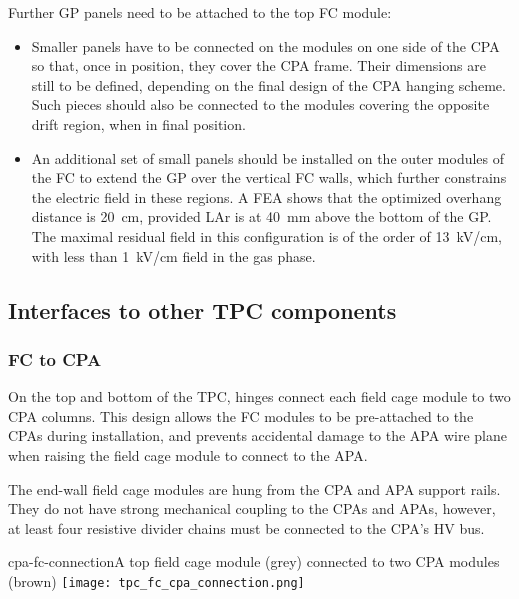 Further GP panels need to be attached to the top FC module:
\begin{itemize}
\item Smaller panels have to be connected on the modules on one side of the CPA so that, once in position, they 
cover the CPA frame. Their dimensions are 
still to be defined, depending on the final design of the CPA hanging scheme. Such  pieces should also be connected to the modules covering the opposite drift region, when in final position.
\item An additional 
set of small panels should be installed on the outer modules of the FC to extend the GP over the vertical FC walls, which 
further constrains the electric field in these regions. A FEA 
shows that the optimized overhang distance is 20~cm, provided LAr is at 40~mm above the bottom of the GP. The maximal residual field in this configuration is of the order of 13~kV/cm, with less than 1~kV/cm field in the gas phase.
\end{itemize}

\subsection{Interfaces to other TPC components}

\subsubsection{FC to CPA}

On the top and bottom of the TPC, hinges connect each field cage module to two CPA columns.  This design allows the FC modules to be pre-attached to the CPAs during installation, and prevents accidental damage to the APA wire plane when raising the field cage module to connect 
to the APA.

The end-wall field cage modules are hung from the CPA and APA support rails.  They do not have strong mechanical coupling to the CPAs and APAs, however, at least four resistive divider chains must be connected to the CPA's HV bus. 

\begin{cdrfigure}{cpa-fc-connection}{A top field cage module (grey) connected to two CPA modules (brown)}
\texttt{[image: tpc\_fc\_cpa\_connection.png]}
\end{cdrfigure}


